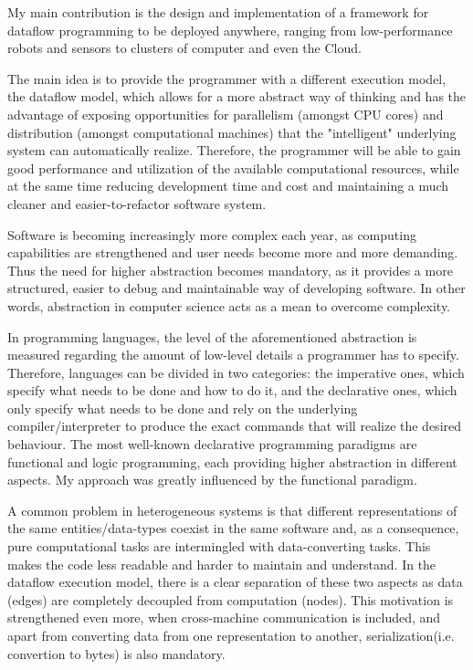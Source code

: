 \documentclass{dithesis}
\begin{document}


My main contribution is the design and implementation of a framework for dataflow programming to be deployed anywhere, ranging from low-performance robots and sensors to clusters of computer and even the Cloud. 

The main idea is to provide the programmer with a different execution model, the dataflow model, which allows for a more abstract way of thinking and has the advantage of exposing opportunities for parallelism (amongst CPU cores) and distribution (amongst computational machines) that the "intelligent" underlying system can automatically realize. Therefore, the programmer will be able to gain good performance and utilization of the available computational resources, while at the same time reducing development time and cost and maintaining a much cleaner and easier-to-refactor software system.




Software is becoming increasingly more complex each year, as computing capabilities are strengthened and user needs become more and more demanding. Thus the need for higher abstraction becomes mandatory, as it provides a more structured, easier to debug and maintainable way of developing software. In other words, abstraction in computer science acts as a mean to overcome complexity. 

In programming languages, the level of the aforementioned abstraction is measured regarding the amount of low-level details a programmer has to specify. Therefore, languages can be divided in two categories: the imperative ones, which specify what needs to be done and how to do it, and the declarative ones, which only specify what needs to be done and rely on the underlying compiler/interpreter to produce the exact commands that will realize the desired behaviour. The most well-known declarative programming paradigms are functional and logic programming, each providing higher abstraction in different aspects. My approach was greatly influenced by the functional paradigm.


A common problem in heterogeneous systems is that different representations of the same entities/data-types coexist in the same software and, as a consequence, pure computational tasks are intermingled with data-converting tasks. This makes the code less readable and harder to maintain and understand. In the dataflow execution model, there is a clear separation of these two aspects as data (edges) are completely decoupled from computation (nodes). This motivation is strengthened even more, when cross-machine communication is included, and apart from converting data from one representation to another, serialization(i.e. convertion to bytes) is also mandatory.
\end{document}
